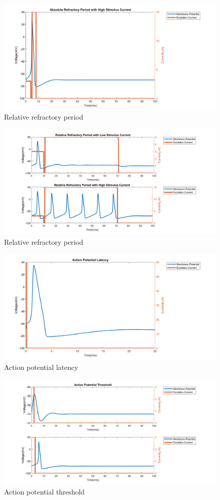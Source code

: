 \documentclass{IEEEtran}
\begin{document}
\begin{figure}[h]
\centering
\includegraphics[width=\textwidth]{Fig5.png}
\caption{Relative refractory period}\label{fig:abe}
\end{figure}

\begin{figure}[h]
\centering
\includegraphics[width=\textwidth]{Fig6.png}
\caption{Relative refractory period}\label{fig:rrp}
\end{figure}

\begin{figure}[h]
\centering
\includegraphics[width=\textwidth]{Fig7.png}
\caption{Action potential latency}\label{fig:apl}
\end{figure}

\begin{figure}[h]
\centering
\includegraphics[width=\textwidth]{Fig8.png}
\caption{Action potential threshold}\label{fig:apth}
\end{figure}

\clearpage
\printbibliography{}
\end{document}
